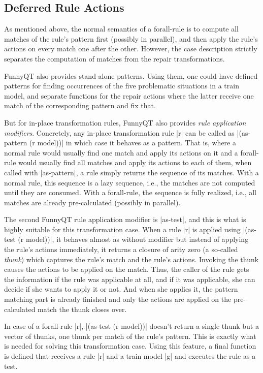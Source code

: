 \documentclass[submission]{eptcs}
\newcommand{\code}{\clojureinline}
\begin{document}
\subsection{Deferred Rule Actions}
\label{sec:deferred-actions}

As mentioned above, the normal semantics of a forall-rule is to compute all
matches of the rule's pattern first (possibly in parallel), and then apply the
rule's actions on every match one after the other.  However, the case
description strictly separates the computation of matches from the repair
transformations.

FunnyQT also provides stand-alone patterns.  Using them, one could have defined
patterns for finding occurrences of the five problematic situations in a train
model, and separate functions for the repair actions where the latter receive
one match of the corresponding pattern and fix that.

But for in-place transformation rules, FunnyQT also provides \emph{rule
  application modifiers}.  Concretely, any in-place transformation rule
\code|r| can be called as \code|(as-pattern (r model))| in which case it
behaves as a pattern.  That is, where a normal rule would usually find one
match and apply its actions on it and a forall-rule would usually find all
matches and apply its actions to each of them, when called with
\code|as-pattern|, a rule simply returns the sequence of its matches.  With a
normal rule, this sequence is a lazy sequence, i.e., the matches are not
computed until they are consumed.  With a forall-rule, the sequence is fully
realized, i.e., all matches are already pre-calculated (possibly in parallel).

The second FunnyQT rule application modifier is \code|as-test|, and this is
what is highly suitable for this transformation case.  When a rule \code|r| is
applied using \code|(as-test (r model))|, it behaves almost as without modifier
but instead of applying the rule's actions immediately, it returns a closure of
arity zero (a so-called \emph{thunk}) which captures the rule's match and the
rule's actions.  Invoking the thunk causes the actions to be applied on the
match.  Thus, the caller of the rule gets the information if the rule was
applicable at all, and if it was applicable, she can decide if she wants to
apply it or not.  And when she applies it, the pattern matching part is already
finished and only the actions are applied on the pre-calculated match the thunk
closes over.

In case of a forall-rule \code|r|, \code|(as-test (r model))| doesn't return a
single thunk but a vector of thunks, one thunk per match of the rule's pattern.
This is exactly what is needed for solving this transformation case.  Using
this feature, a final function is defined that receives a rule \code|r| and a
train model \code|g| and executes the rule as a test.
\end{document}
